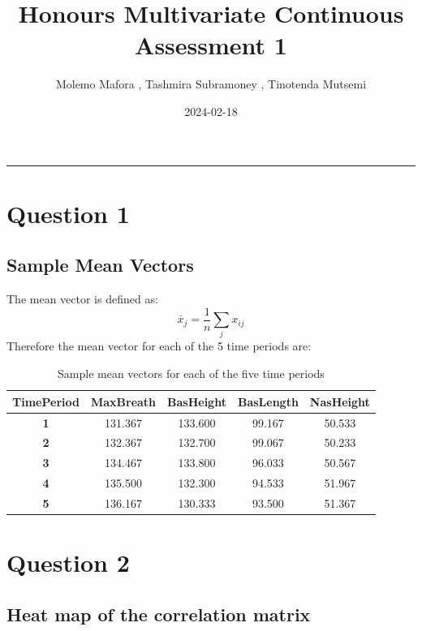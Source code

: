 \documentclass[
]{article}
\title{Honours Multivariate Continuous Assessment 1}
\author{Molemo Mafora , Tashmira Subramoney , Tinotenda Mutsemi}
\date{2024-02-18}
\begin{document}
\maketitle

\begin{center}\rule{0.5\linewidth}{0.5pt}\end{center}

\section{Question 1}
\subsection{Sample Mean Vectors}

The mean vector is defined as: \[
\bar{x}_{j} = \frac{1}{n}\sum_{j}x_{ij} 
\] Therefore the mean vector for each of the 5 time periods are:

\begin{table}[!h]
\begin{center}
\caption{Sample mean vectors for each of the five time periods}
\vspace{0.5cm}
\begin{tabular}{|c|c|c|c|c|}
\hline
\textbf{TimePeriod} & \textbf{MaxBreath} & \textbf{BasHeight} & \textbf{BasLength} & \textbf{NasHeight} \\
\hline
\textbf{1} & 131.367    & 133.600 & 99.167 & 50.533 \\
\textbf{2} & 132.367    & 132.700 & 99.067  & 50.233 \\
\textbf{3} & 134.467    & 133.800 & 96.033 & 50.567 \\
\textbf{4} & 135.500    & 132.300 & 94.533  & 51.967 \\  
\textbf{5} & 136.167    & 130.333 & 93.500 & 51.367 \\  
\hline
\end{tabular}
\end{center}
\end{table}

\newpage
\section{Question 2}
\subsection{Heat map of the correlation matrix}
\end{document}
